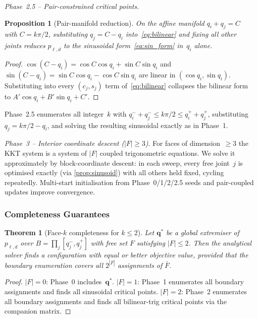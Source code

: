 \documentclass[journal]{IEEEtran}
\newtheorem{theorem}{Theorem}
\newtheorem{proposition}{Proposition}
\begin{document}
\emph{Phase~2.5 -- Pair-constrained critical points.}
\begin{proposition}[Pair-manifold reduction]\label{prop:pair_reduce}
On the affine manifold $q_i + q_j = C$ with $C = k\pi/2$,
substituting $q_j = C - q_i$ into~\eqref{eq:bilinear} and fixing
all other joints reduces $p_{\ell,d}$ to the sinusoidal
form~\eqref{eq:sin_form} in~$q_i$ alone.
\end{proposition}
\begin{proof}
$\cos(C-q_i) = \cos C \cos q_i + \sin C \sin q_i$ and
$\sin(C-q_i) = \sin C \cos q_i - \cos C \sin q_i$ are linear
in $(\cos q_i, \sin q_i)$.
Substituting into every $(c_j, s_j)$ term of~\eqref{eq:bilinear}
collapses the bilinear form to $A'\cos q_i + B'\sin q_i + C'$.
\end{proof}
Phase~2.5 enumerates all integer~$k$ with
$q_i^- + q_j^- \leq k\pi/2 \leq q_i^+ + q_j^+$,
substituting $q_j = k\pi/2 - q_i$,
and solving the resulting sinusoidal exactly as in Phase~1.

\emph{Phase~3 -- Interior coordinate descent ($|F|\geq 3$).}
For faces of dimension~$\geq 3$ the KKT system is a system of
$|F|$ coupled trigonometric equations.
We solve it approximately by block-coordinate descent:
in each sweep, every free joint~$j$ is optimised exactly
(via \cref{prop:sinusoid}) with all others held fixed, cycling
repeatedly.
Multi-start initialisation from Phase~0/1/2/2.5 seeds and
pair-coupled updates improve convergence.


\subsubsection{Completeness Guarantees}\label{sec:completeness}

\begin{theorem}[Face-$k$ completeness for $k \leq 2$]\label{thm:face_complete}
Let $\bm{q}^*$ be a global extremiser of $p_{\ell,d}$ over
$B = \prod_j [q_j^-,q_j^+]$ with free set $F$ satisfying $|F|\leq 2$.
Then the analytical solver finds a configuration with equal or
better objective value, provided that the boundary enumeration
covers all $2^{|\bar F|}$ assignments of $\bar F$.
\end{theorem}
\begin{proof}
$|F|=0$: Phase~0 includes~$\bm{q}^*$.
$|F|=1$: Phase~1 enumerates all boundary assignments and finds
all sinusoidal critical points.
$|F|=2$: Phase~2 enumerates all boundary assignments and finds
all bilinear-trig critical points via the companion matrix.
\end{proof}
\end{document}
